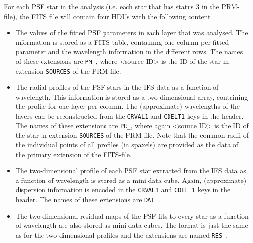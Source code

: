 \documentclass[a4paper,10pt]{article}
\begin{document}
For each PSF star in the analysis (i.e. each star that has status 3 in the PRM-file), the FITS file will contain four HDUs with the following content.
\begin{itemize}
 \item The values of the fitted PSF parameters in each layer that was analysed. The information is stored as a FITS-table, containing one column per fitted parameter and the wavelength information in the different rows. The names of these extensions are \texttt{PM\_<source ID>}, where <source ID> is the ID of the star in extension \texttt{SOURCES} of the PRM-file.
 \item The radial profiles of the PSF stars in the IFS data as a function of wavelength. This information is stored as a two-dimensional array, containing the profile for one layer per column. The (approximate) wavelengths of the layers can be reconstructed from the \texttt{CRVAL1} and \texttt{CDELT1} keys in the header. The names of these extensions are \texttt{PR\_<source ID>}, where again <source ID> is the ID of the star in extension \texttt{SOURCES} of the PRM-file. Note that the common radii of the individual points of all profiles (in spaxels) are provided as the data of the primary extension of the FITS-file.
 \item The two-dimensional profile of each PSF star extracted from the IFS data as a function of wavelength is stored as a mini data cube. Again, (approximate) dispersion information is encoded in the \texttt{CRVAL1} and \texttt{CDELT1} keys in the header. The names of these extensions are \texttt{DAT\_<source ID>}.
 \item The two-dimensional residual maps of the PSF fits to every star as a function of wavelength are also stored as mini data cubes. The format is just the same as for the two dimensional profiles and the extensions are named \texttt{RES\_<source ID>}.
\end{itemize}



\end{document}
